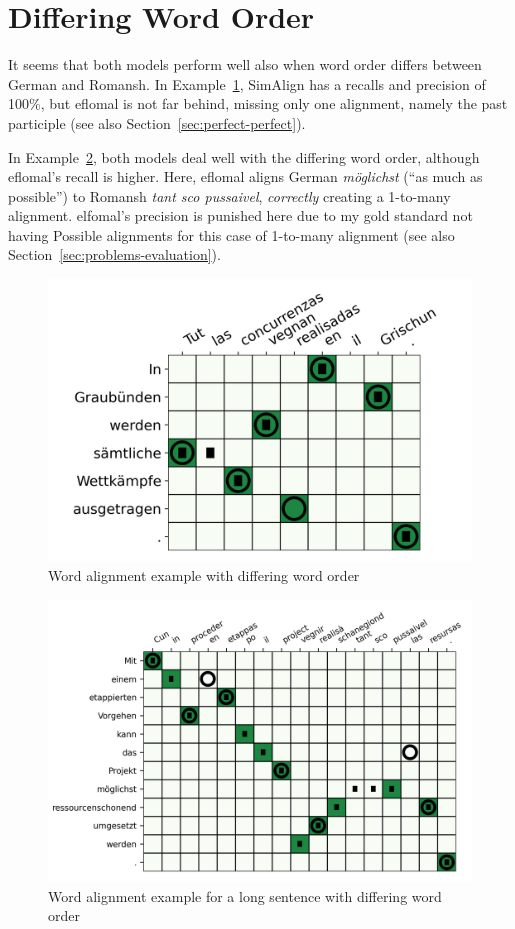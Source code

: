 \section{Differing Word Order}
It seems that both models perform well also when word order differs between German and Romansh. 
In Example~\ref{fig:380-in-graubuenden}, SimAlign has a recalls and precision of 100\%, but eflomal is not far behind, missing only one alignment, namely the past participle (see also Section~\ref{sec:perfect-perfect}).

In Example~\ref{fig:232-mit-einem}, both models deal well with the differing word order, although eflomal's recall is higher. 
Here, eflomal aligns German \emph{möglichst} (\enquote{as much as possible})  to Romansh \emph{tant sco pussaivel}, \emph{correctly} creating a 1-to-many alignment. 
elfomal's precision is punished here due to my gold standard not having Possible alignments for this case of 1-to-many alignment (see also Section~\ref{sec:problems-evaluation}). 

\begin{figure}
	\includegraphics{graphics/alignments/380.png}
	\caption{Word alignment example with differing word order}
	\label{fig:380-in-graubuenden}
\end{figure}


\begin{figure}
	\includegraphics{graphics/alignments/232.png}
	\caption{Word alignment example for a long sentence with differing word order}
	\label{fig:232-mit-einem}
\end{figure}



